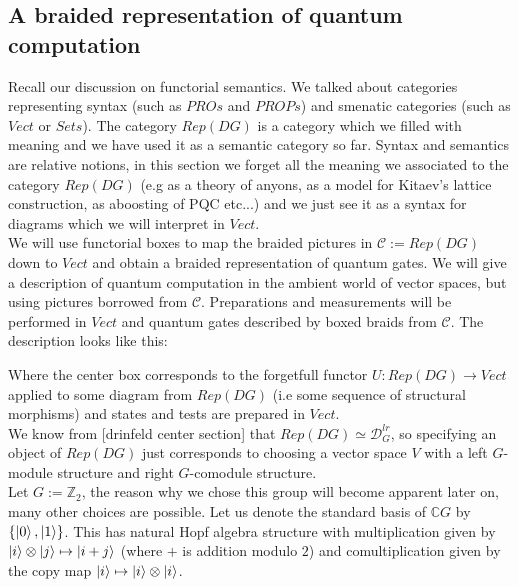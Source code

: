 \documentclass{article}
\newcommand{\cat}{\mathcal{C}}
\begin{document}
\subsection{A braided representation of quantum computation}
Recall our discussion on functorial semantics. We talked about categories representing syntax (such as $PROs$ and $PROPs$) and smenatic categories (such as $Vect$ or $Sets$). The category $Rep(DG)$ is a category which we filled with meaning and we have used it as a semantic category so far. Syntax and semantics are relative notions, in this section we forget all the meaning we associated to the category $Rep(DG)$ (e.g as a theory of anyons, as a model for Kitaev's lattice construction, as aboosting of PQC etc...) and we just see it as a syntax for diagrams which we will interpret in $Vect$.\\
We will use functorial boxes \cite{Mellies06} to map the braided pictures in $\cat := Rep(DG)$ down to $Vect$ and obtain a braided representation of quantum gates. We will give a description of quantum computation in the ambient world of vector spaces, but using pictures borrowed from $\cat$. Preparations and measurements will be performed in $Vect$ and quantum gates described by boxed braids from $\cat$. The description looks like this:
\begin{center}
\end{center}
Where the center box corresponds to the forgetfull functor $U: Rep(DG) \rightarrow Vect$ applied to some diagram from $Rep(DG)$ (i.e some sequence of structural morphisms) and states and tests are prepared in $Vect$.\\
We know from [drinfeld center section] that $Rep(DG) \simeq \mathcal{D}_G^{lr}$, so specifying an object of $Rep(DG)$ just corresponds to choosing a vector space $V$ with a left $G$-module structure  and right $G$-comodule structure.\\
Let $G:= \mathbb{Z}_2$, the reason why we chose this group will become apparent later on, many other choices are possible. Let us denote the standard basis of $\mathbb{C}G$ by $\{ \ket{0}, \ket{1}\}$. This has natural Hopf algebra structure with multiplication given by $\ket{i}\otimes \ket{j} \mapsto \ket{i+j}$ (where $+$ is addition modulo $2$) and comultiplication given by the copy map $\ket{i} \mapsto \ket{i}\otimes \ket{i} $.\\
\end{document}
